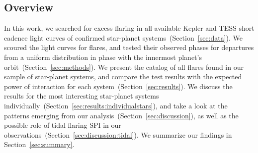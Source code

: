 \documentclass[twocolumn]{aastex631}
\begin{document}
\subsection{Overview}
In this work, we searched for excess flaring in all available Kepler and TESS short cadence light curves of confirmed star-planet systems~(Section~\ref{sec:data}). We scoured the light curves for flares, and tested their observed phases for departures from a uniform distribution in phase with the innermost planet's orbit~(Section~\ref{sec:methods}). We present the catalog of all flares found in our sample of star-planet systems, and compare the test results with the expected power of interaction for each system~(Section~\ref{sec:results}). We discuss the results for the most interesting star-planet systems individually~(Section~\ref{sec:results:individualstars}), and take a look at the patterns emerging from our analysis~(Section~\ref{sec:discussion}), as well as the possible role of tidal flaring SPI in our observations~(Section~\ref{sec:discussion:tidal}).  We summarize our findings in Section~\ref{sec:summary}. 








\end{document}
